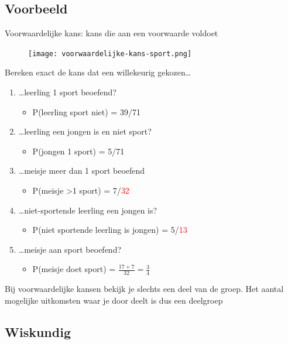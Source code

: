 \documentclass{article}
\begin{document}
\subsection{Voorbeeld}

Voorwaardelijke kans: kans die aan een voorwaarde voldoet

\begin{figure}[H]
    \centering
    \texttt{[image: voorwaardelijke-kans-sport.png]}
\end{figure}

Bereken exact de kans dat een willekeurig gekozen\dots

\begin{enumerate}
    \item \dots leerling 1 sport beoefend?
    \begin{itemize}
        \item P(leerling sport niet) = 39/71
    \end{itemize}
    \item \dots leerling een jongen is en niet sport?
    \begin{itemize}
        \item P(jongen 1 sport) = 5/71
    \end{itemize}
    \item \dots meisje meer dan 1 sport beoefend
    \begin{itemize}
        \item P(meisje >1 sport) = 7/\textcolor{red}{32}
    \end{itemize}
    \item \dots niet-sportende leerling een jongen is?
    \begin{itemize}
        \item P(niet sportende leerling is jongen) = 5/\textcolor{red}{13}
    \end{itemize}
    \item \dots meisje aan sport beoefend?
    \begin{itemize}
        \item P(meisje doet sport) = $\frac{17 + 7}{32} = \frac34$
    \end{itemize}
\end{enumerate}

Bij voorwaardelijke kansen bekijk je slechts een deel van de groep.
Het aantal mogelijke uitkomsten waar je door deelt is dus een deelgroep

\subsection{Wiskundig}
\end{document}
